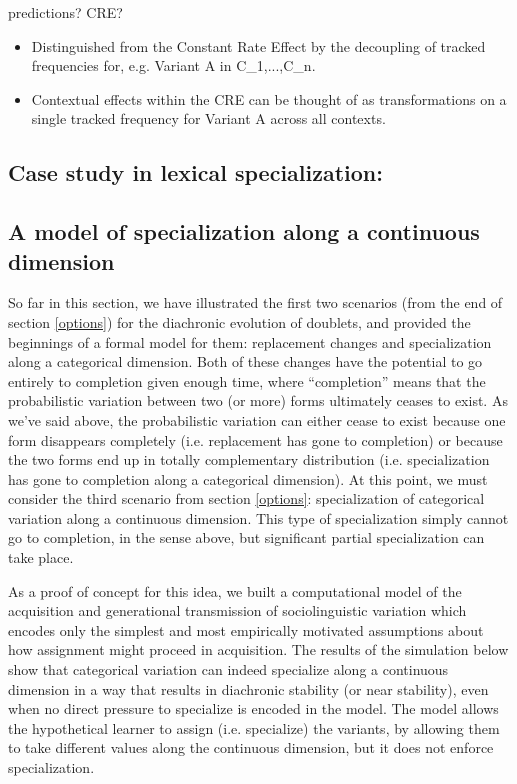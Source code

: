 predictions?
CRE?

\begin{itemize}
			\item Distinguished from the Constant Rate Effect by the decoupling of tracked frequencies for, e.g. Variant A in C\_1,...,C\_n.
			\item Contextual effects within the CRE can be thought of as transformations on a single tracked frequency for Variant A across all contexts.
\end{itemize}

\subsection{Case study in lexical specialization: }

\subsection{A model of specialization along a continuous dimension}

So far in this section, we have illustrated the first two scenarios (from the end of section \ref{options}) for the diachronic evolution of doublets, and provided the beginnings of a formal model for them: replacement changes and specialization along a categorical dimension.
Both of these changes have the potential to go entirely to completion given enough time, where ``completion'' means that the probabilistic variation between two (or more) forms ultimately ceases to exist.
As we've said above, the probabilistic variation can either cease to exist because one form disappears completely (i.e. replacement has gone to completion) or because the two forms end up in totally complementary distribution (i.e. specialization has gone to completion along a categorical dimension).
At this point, we must consider the third scenario from section \ref{options}: specialization of categorical variation along a continuous dimension.
This type of specialization simply cannot go to completion, in the sense above, but significant partial specialization can take place.


As a proof of concept for this idea, we built a computational model of the acquisition and generational transmission of sociolinguistic variation which encodes only the simplest and most empirically motivated assumptions about how assignment might proceed in acquisition.
The results of the simulation below show that categorical variation can indeed specialize along a continuous dimension in a way that results in diachronic stability (or near stability), even when no direct pressure to specialize is encoded in the model.
The model allows the hypothetical learner to assign (i.e. specialize) the variants, by allowing them to take different values along the continuous dimension, but it does not enforce specialization.


